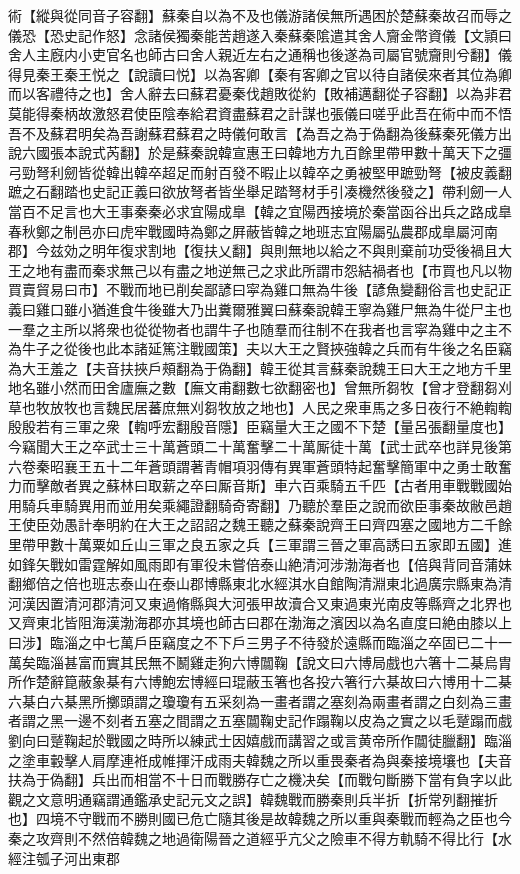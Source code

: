 術【縱與從同音子容翻】蘇秦自以為不及也儀游諸侯無所遇困於楚蘇秦故召而辱之儀恐【恐史記作怒】念諸侯獨秦能苦趙遂入秦蘇秦隂遣其舍人齎金幣資儀【文頴曰舍人主廐内小吏官名也師古曰舍人親近左右之通稱也後遂為司屬官號齎則兮翻】儀得見秦王秦王悦之【說讀曰悦】以為客卿【秦有客卿之官以待自諸侯來者其位為卿而以客禮待之也】舍人辭去曰蘇君憂秦伐趙敗從約【敗補邁翻從子容翻】以為非君莫能得秦柄故激怒君使臣陰奉給君資盡蘇君之計謀也張儀曰嗟乎此吾在術中而不悟吾不及蘇君明矣為吾謝蘇君蘇君之時儀何敢言【為吾之為于偽翻為後蘇秦死儀方出說六國張本說式芮翻】於是蘇秦說韓宣惠王曰韓地方九百餘里帶甲數十萬天下之彊弓勁弩利劒皆從韓出韓卒超足而射百發不暇止以韓卒之勇被堅甲蹠勁弩【被皮義翻蹠之石翻踏也史記正義曰欲放弩者皆坐舉足踏弩材手引凑機然後發之】帶利劒一人當百不足言也大王事秦秦必求宜陽成臯【韓之宜陽西接境於秦當函谷出兵之路成臯春秋鄭之制邑亦曰虎牢戰國時為鄭之屛蔽皆韓之地班志宜陽屬弘農郡成臯屬河南郡】今兹効之明年復求割地【復扶乂翻】與則無地以給之不與則棄前功受後禍且大王之地有盡而秦求無己以有盡之地逆無己之求此所謂市怨結禍者也【市買也凡以物買賣貿易曰市】不戰而地已削矣鄙諺曰寜為雞口無為牛後【諺魚變翻俗言也史記正義曰雞口雖小猶進食牛後雖大乃出糞爾雅翼曰蘇秦說韓王寧為雞尸無為牛從尸主也一羣之主所以將衆也從從物者也謂牛子也随羣而往制不在我者也言寜為雞中之主不為牛子之從後也此本諸延篤注戰國策】夫以大王之賢挾強韓之兵而有牛後之名臣竊為大王羞之【夫音扶挾戶頰翻為于偽翻】韓王從其言蘇秦說魏王曰大王之地方千里地名雖小然而田舍廬廡之數【廡文甫翻數七欲翻密也】曾無所芻牧【曾才登翻芻刈草也牧放牧也言魏民居蕃庶無刈芻牧放之地也】人民之衆車馬之多日夜行不絶輷輷殷殷若有三軍之衆【輷呼宏翻殷音隱】臣竊量大王之國不下楚【量呂張翻量度也】今竊聞大王之卒武士三十萬蒼頭二十萬奮擊二十萬厮徒十萬【武士武卒也詳見後第六卷秦昭襄王五十二年蒼頭謂著青帽項羽傳有異軍蒼頭特起奮擊簡軍中之勇士敢奮力而擊敵者異之蘇林曰取薪之卒曰厮音斯】車六百乘騎五千匹【古者用車戰戰國始用騎兵車騎異用而並用矣乘繩證翻騎奇寄翻】乃聽於羣臣之說而欲臣事秦故敝邑趙王使臣効愚計奉明約在大王之詔詔之魏王聽之蘇秦說齊王曰齊四塞之國地方二千餘里帶甲數十萬粟如丘山三軍之良五家之兵【三軍謂三晉之軍高誘曰五家即五國】進如鋒矢戰如雷霆解如風雨即有軍役未嘗倍泰山絶清河涉渤海者也【倍與背同音蒲妹翻鄉倍之倍也班志泰山在泰山郡博縣東北水經淇水自館陶清淵東北過廣宗縣東為清河漢因置清河郡清河又東過脩縣與大河張甲故瀆合又東過東光南皮等縣齊之北界也又齊東北皆阻海漢渤海郡亦其境也師古曰郡在渤海之濱因以為名直度曰絶由膝以上曰涉】臨淄之中七萬戶臣竊度之不下戶三男子不待發於遠縣而臨淄之卒固已二十一萬矣臨淄甚富而實其民無不鬭雞走狗六博闒鞠【說文曰六博局戲也六箸十二棊烏胄所作楚辭箟蔽象棊有六博鮑宏博經曰琨蔽玉箸也各投六箸行六棊故曰六博用十二棊六棊白六棊黑所擲頭謂之瓊瓊有五采刻為一畫者謂之塞刻為兩畫者謂之白刻為三畫者謂之黑一邊不刻者五塞之間謂之五塞闒鞠史記作蹋鞠以皮為之實之以毛蹵蹋而戲劉向曰蹵鞠起於戰國之時所以練武士因嬉戲而講習之或言黄帝所作闒徒臘翻】臨淄之塗車轂擊人肩摩連袵成帷揮汗成雨夫韓魏之所以重畏秦者為與秦接境壤也【夫音扶為于偽翻】兵出而相當不十日而戰勝存亡之機决矣【而戰句斷勝下當有負字以此觀之文意明通竊謂通鑑承史記元文之誤】韓魏戰而勝秦則兵半折【折常列翻摧折也】四境不守戰而不勝則國已危亡隨其後是故韓魏之所以重與秦戰而輕為之臣也今秦之攻齊則不然倍韓魏之地過衛陽晉之道經乎亢父之險車不得方軌騎不得比行【水經注瓠子河出東郡